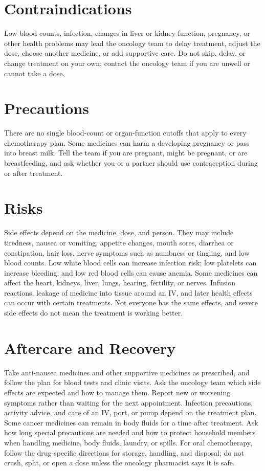\section*{Contraindications}
Low blood counts, infection, changes in liver or kidney function, pregnancy, or other health problems may lead the oncology team to delay treatment, adjust the dose, choose another medicine, or add supportive care. Do not skip, delay, or change treatment on your own; contact the oncology team if you are unwell or cannot take a dose.

\section*{Precautions}
There are no single blood-count or organ-function cutoffs that apply to every chemotherapy plan. Some medicines can harm a developing pregnancy or pass into breast milk. Tell the team if you are pregnant, might be pregnant, or are breastfeeding, and ask whether you or a partner should use contraception during or after treatment.

\section*{Risks}
Side effects depend on the medicine, dose, and person. They may include tiredness, nausea or vomiting, appetite changes, mouth sores, diarrhea or constipation, hair loss, nerve symptoms such as numbness or tingling, and low blood counts. Low white blood cells can increase infection risk; low platelets can increase bleeding; and low red blood cells can cause anemia. Some medicines can affect the heart, kidneys, liver, lungs, hearing, fertility, or nerves. Infusion reactions, leakage of medicine into tissue around an IV, and later health effects can occur with certain treatments. Not everyone has the same effects, and severe side effects do not mean the treatment is working better.

\section*{Aftercare and Recovery}
Take anti-nausea medicines and other supportive medicines as prescribed, and follow the plan for blood tests and clinic visits. Ask the oncology team which side effects are expected and how to manage them. Report new or worsening symptoms rather than waiting for the next appointment. Infection precautions, activity advice, and care of an IV, port, or pump depend on the treatment plan. Some cancer medicines can remain in body fluids for a time after treatment. Ask how long special precautions are needed and how to protect household members when handling medicine, body fluids, laundry, or spills. For oral chemotherapy, follow the drug-specific directions for storage, handling, and disposal; do not crush, split, or open a dose unless the oncology pharmacist says it is safe.

